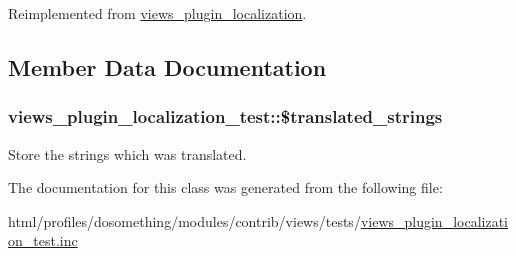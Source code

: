 Reimplemented from \hyperlink{classviews__plugin__localization_a5c8353f0c80d4cf160e36133316f0a59}{views\_\-plugin\_\-localization}.

\subsection{Member Data Documentation}
\hypertarget{classviews__plugin__localization__test_a5d2bdbe2516d31dba8f59354562bce4a}{
\subsubsection[{\$translated\_\-strings}]{\setlength{\rightskip}{0pt plus 5cm}views\_\-plugin\_\-localization\_\-test::\$translated\_\-strings}}
\label{classviews__plugin__localization__test_a5d2bdbe2516d31dba8f59354562bce4a}
Store the strings which was translated. 

The documentation for this class was generated from the following file:\begin{DoxyCompactItemize}
\item 
html/profiles/dosomething/modules/contrib/views/tests/\hyperlink{views__plugin__localization__test_8inc}{views\_\-plugin\_\-localization\_\-test.inc}\end{DoxyCompactItemize}
